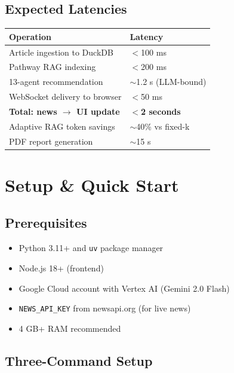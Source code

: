 \documentclass[11pt, a4paper]{article}
\begin{document}
\subsection{Expected Latencies}

\begin{center}
\small
\begin{tabular}{L{6cm} C{4cm}}
  \toprule
  \textbf{Operation} & \textbf{Latency} \\
  \midrule
  Article ingestion to DuckDB     & $<$100 ms \\
  Pathway RAG indexing            & $<$200 ms \\
  13-agent recommendation         & $\sim$1.2 s (LLM-bound) \\
  WebSocket delivery to browser   & $<$50 ms \\
  \textbf{Total: news $\to$ UI update} & \boldmath$<$\textbf{2 seconds} \\
  Adaptive RAG token savings      & $\sim$40\% vs fixed-k \\
  PDF report generation           & $\sim$15 s \\
  \bottomrule
\end{tabular}
\end{center}

\section{Setup \& Quick Start}

\subsection{Prerequisites}

\begin{itemize}[leftmargin=1.6em, itemsep=2pt]
  \item Python 3.11+ and \texttt{uv} package manager
  \item Node.js 18+ (frontend)
  \item Google Cloud account with Vertex AI (Gemini 2.0 Flash)
  \item \texttt{NEWS\_API\_KEY} from newsapi.org (for live news)
  \item 4 GB+ RAM recommended
\end{itemize}

\subsection{Three-Command Setup}
\end{document}
